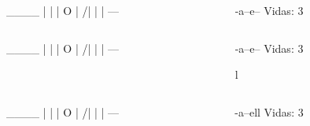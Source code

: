 \documentclass[spanish]{beamer}
\begin{document}

\begin{frame}[fragile]
  \begin{columns}[onlytextwidth,T]
    \begin{column}{.5\textwidth}
        \begin{code}
  ____
  |  |
  |  O
  | /|
  |
  |
 ---
        \end{code}
    \end{column}
    \begin{column}{.5\textwidth}
      \begin{code}


 -a--e--          Vidas: 3




      \end{code}
    \end{column}
  \end{columns}
\end{frame}


\begin{frame}[fragile]
  \begin{columns}[onlytextwidth,T]
    \begin{column}{.5\textwidth}
        \begin{code}
  ____
  |  |
  |  O
  | /|
  |
  |
 ---
        \end{code}
    \end{column}
    \begin{column}{.5\textwidth}
      \begin{code}


 -a--e--          Vidas: 3

 l


      \end{code}
    \end{column}
  \end{columns}
\end{frame}


\begin{frame}[fragile]
  \begin{columns}[onlytextwidth,T]
    \begin{column}{.5\textwidth}
        \begin{code}
  ____
  |  |
  |  O
  | /|
  |
  |
 ---
        \end{code}
    \end{column}
    \begin{column}{.5\textwidth}
      \begin{code}


 -a--ell          Vidas: 3




      \end{code}
    \end{column}
  \end{columns}
\end{frame}
\end{document}
